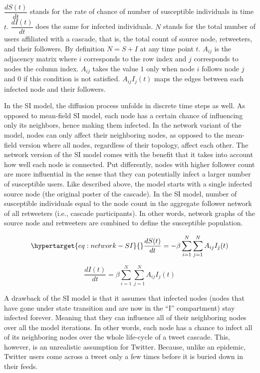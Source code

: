 \documentclass[11pt,a4paper]{article}
\begin{document}
        $\dfrac{dS(t)}{dt}$ stands for the rate of chance of number of susceptible individuals in time $t$. $\dfrac{dI(t)}{dt}$ does the same for infected individuals. $N$ stands for the total number of users affiliated with a cascade, that is, the total count of source node, retweeters, and their followers. By definition $N = S + I$ at any time point $t$. $A_{ij}$ is the adjacency matrix where $i$ corresponds to the row index and $j$ corresponds to nodes the column index. $A_{ij}$ takes the value $1$ only when node $i$ follows node $j$ and $0$ if this condition is not satisfied. $A_{ij} I_j(t)$ maps the edges between each infected node and their followers.
            
        In the SI model, the diffusion process unfolds in discrete time steps as well. As opposed to mean-field SI model, each node has a certain chance of influencing only its neighbors, hence making them infected. In the network variant of the model, nodes can only affect their neighboring nodes, as opposed to the mean-field version where all nodes, regardless of their topology, affect each other. The network version of the SI model comes with the benefit that it takes into account how well each node is connected. Put differently, nodes with higher follower count are more influential in the sense that they can potentially infect a larger number of susceptible users. Like described above, the model starts with a single infected source node (the original poster of the cascade). In the SI model, number of susceptible individuals equal to the node count in the aggregate follower network of all retweeters (i.e., cascade participants). In other words, network graphs of the source node and retweeters are combined to define the susceptible population.

        \begin{equation}
            \hypertarget{eq:network-SI}{}
            \frac{dS(t)}{dt} = - \beta \sum_{i=1}^N \sum_{j=1}^N A_{ij} I_j(t) 
        \end{equation}

        \begin{equation}
            \frac{dI(t)}{dt} = \beta \sum_{i=1}^N \sum_{j=1}^N A_{ij} I_j(t)
        \end{equation}



        A drawback of the SI model is that it assumes that infected nodes (nodes that have gone under state transition and are now in the “I” compartment) stay infected forever. Meaning that they can influence all of their neighboring nodes over all the model iterations. In other words, each node has a chance to infect all of its neighboring nodes over the whole life-cycle of a tweet cascade. This, however, is an unrealistic assumption for Twitter. Because, unlike an epidemic, Twitter users come across a tweet only a few times before it is buried down in their feeds.
\end{document}
